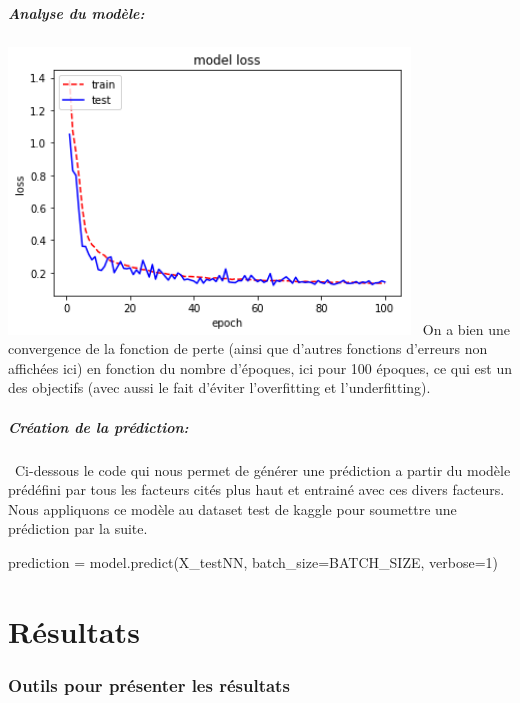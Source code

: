 \documentclass[a4paper,oneside,11pt]{article}
\begin{document}
\subsubsection*{Analyse du modèle:}
%
\includegraphics[width=0.8\textwidth]{image_rapport/lossNN} \newline
\ On a bien une convergence de la fonction de perte (ainsi que d'autres fonctions d'erreurs non affichées ici) en fonction du nombre d'époques, ici pour 100 époques, ce qui est un des objectifs (avec aussi le fait d'éviter l'overfitting et l'underfitting).

\subsubsection*{Création de la prédiction:}
%
\ Ci-dessous le code qui nous permet de générer une prédiction a partir du modèle prédéfini par tous les facteurs cités plus haut et entrainé avec ces divers facteurs. Nous appliquons ce modèle au dataset test de kaggle pour soumettre une prédiction par la suite.
\begin{code-Python}
prediction = model.predict(X_testNN, batch_size=BATCH_SIZE, verbose=1)
\end{code-Python}
\newpage
\part{Résultats}
\section*{Outils pour présenter les résultats}
%
\end{document}
